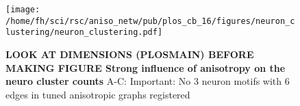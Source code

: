 

\begin{figure}[ht]
\texttt{[image: /home/fh/sci/rsc/aniso\_netw/pub/plos\_cb\_16/figures/neuron\_clustering/neuron\_clustering.pdf]}
\caption{{\bf LOOK AT DIMENSIONS (PLOSMAIN) BEFORE MAKING FIGURE Strong influence of anisotropy on the neuro cluster counts}
A-C: Important: No 3 neuron motifs with 6 edges in tuned anisotropic
graphs registered}
\label{fig_cluster}%
\end{figure}
